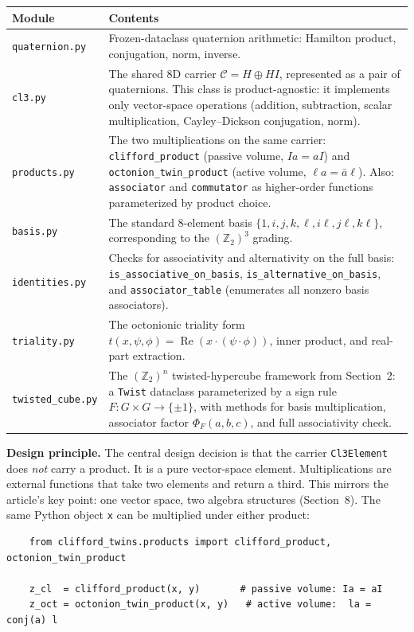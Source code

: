 \documentclass[11pt]{article}
\begin{document}
\begin{center}
\renewcommand{\arraystretch}{1.2}
\begin{tabular}{lp{}}
\toprule
\textbf{Module} & \textbf{Contents} \\
\midrule
\texttt{quaternion.py} & Frozen-dataclass quaternion arithmetic: Hamilton
  product, conjugation, norm, inverse. \\
\texttt{cl3.py} & The shared 8D carrier $\mathcal C = H \oplus HI$, represented
  as a pair of quaternions. This class is product-agnostic: it implements only
  vector-space operations (addition, subtraction, scalar multiplication,
  Cayley--Dickson conjugation, norm). \\
\texttt{products.py} & The two multiplications on the same carrier:
  \texttt{clifford\_product} (passive volume, $Ia = aI$) and
  \texttt{octonion\_twin\_product} (active volume, $\ell a = \bar{a}\ell$).
  Also: \texttt{associator} and \texttt{commutator} as higher-order functions
  parameterized by product choice. \\
\texttt{basis.py} & The standard 8-element basis
  $\{1, i, j, k, \ell, i\ell, j\ell, k\ell\}$, corresponding to the
  $(\mathbb Z_2)^3$ grading. \\
\texttt{identities.py} & Checks for associativity and alternativity on the
  full basis: \texttt{is\_associative\_on\_basis},
  \texttt{is\_alternative\_on\_basis}, and \texttt{associator\_table}
  (enumerates all nonzero basis associators). \\
\texttt{triality.py} & The octonionic triality form
  $t(x,\psi,\phi) = \operatorname{Re}(x \cdot (\psi \cdot \phi))$, inner
  product, and real-part extraction. \\
\texttt{twisted\_cube.py} & The $(\mathbb Z_2)^n$ twisted-hypercube framework
  from Section~2: a \texttt{Twist} dataclass parameterized by a sign rule
  $F: G \times G \to \{\pm 1\}$, with methods for basis multiplication,
  associator factor $\Phi_F(a,b,c)$, and full associativity check. \\
\bottomrule
\end{tabular}
\end{center}

\medskip

\noindent\textbf{Design principle.}
The central design decision is that the carrier
\texttt{Cl3Element} does \emph{not} carry a product. It is a pure
vector-space element. Multiplications are external functions that take two
elements and return a third. This mirrors the article's key point: one
vector space, two algebra structures (Section~8). The same Python object
\texttt{x} can be multiplied under either product:
\begin{verbatim}
    from clifford_twins.products import clifford_product, octonion_twin_product

    z_cl  = clifford_product(x, y)       # passive volume: Ia = aI
    z_oct = octonion_twin_product(x, y)   # active volume:  la = conj(a) l
\end{verbatim}
\end{document}
